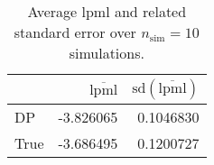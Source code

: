 \begin{table}[H]

\caption{Average lpml and related standard error over $n_{\text{sim}} = 10$ simulations.}
\centering
\begin{tabular}[t]{lrr}
\toprule
  & $\overbar{\text{lpml}}$ & $\text{sd}(\overbar{\text{lpml}})$\\
\midrule
DP & -3.826065 & 0.1046830\\
True & -3.686495 & 0.1200727\\
\bottomrule
\end{tabular}
\end{table}